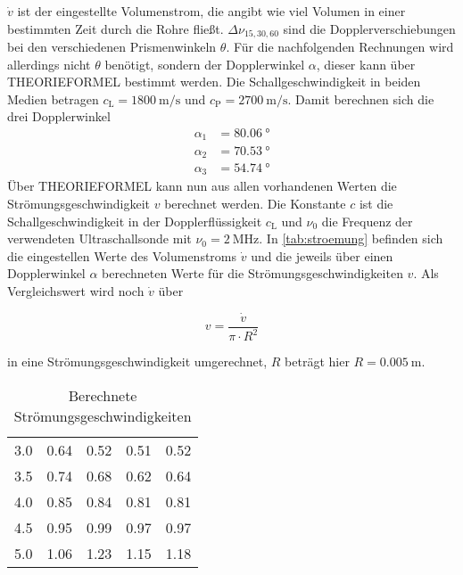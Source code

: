 $\dot{v}$ ist der eingestellte Volumenstrom, die angibt wie viel Volumen in einer bestimmten Zeit durch die Rohre fließt. 
$\Delta \nu _{15,30,60}$ sind die Dopplerverschiebungen bei den verschiedenen Prismenwinkeln $\theta$.
Für die nachfolgenden Rechnungen wird allerdings nicht $\theta$ benötigt, sondern der Dopplerwinkel $\alpha$, dieser kann über THEORIEFORMEL bestimmt werden.
Die Schallgeschwindigkeit in beiden Medien betragen $c_\text{L} = \SI{1800}{\meter\per\second}$ und $c_\text{P} = \SI{2700}{\meter\per\second}$.
Damit berechnen sich die drei Dopplerwinkel
\begin{align}
\alpha_1 &= \SI{80.06}{\degree}\\
\alpha_2 &= \SI{70.53}{\degree}\\
\alpha_3 &= \SI{54.74}{\degree}
\end{align}
Über THEORIEFORMEL kann nun aus allen vorhandenen Werten die Strömungsgeschwindigkeit $v$ berechnet werden.
Die Konstante $c$ ist die Schallgeschwindigkeit in der Dopplerflüssigkeit $c_\text{L}$ und $\nu _0$ die Frequenz der verwendeten Ultraschallsonde mit $\nu _0 = \SI{2}{\mega\hertz}$.
In \autoref{tab:stroemung} befinden sich die eingestellen Werte des Volumenstroms $\dot{v}$ und die jeweils über einen Dopplerwinkel $\alpha$ berechneten Werte für die Strömungsgeschwindigkeiten $v$.
Als Vergleichswert wird noch $\dot{v}$ über 

\begin{equation}
v = \frac{\dot{v}}{\pi \cdot R^2}
\end{equation}

in eine Strömungsgeschwindigkeit umgerechnet, $R$ beträgt hier $R = \SI{0.005}{\meter}$.

\begin{table}
    \centering
    \caption{Berechnete Strömungsgeschwindigkeiten}
    \begin{tabular}{S[table-format=1.1] S[table-format=1.2] S[table-format=1.2] S[table-format=1.2] S[table-format=1.2]}
        \toprule
         &  &  & & \\
         & 0.64 & 0.52 & 0.51 & 0.52 \\
        3.5 & 0.74 & 0.68 & 0.62 & 0.64 \\
        4.0 & 0.85 & 0.84 & 0.81 & 0.81 \\
        4.5 & 0.95 & 0.99 & 0.97 & 0.97 \\
        5.0 & 1.06 & 1.23 & 1.15 & 1.18 \\
        \bottomrule
    \end{tabular}
    \label{tab:stroemung}
\end{table}

